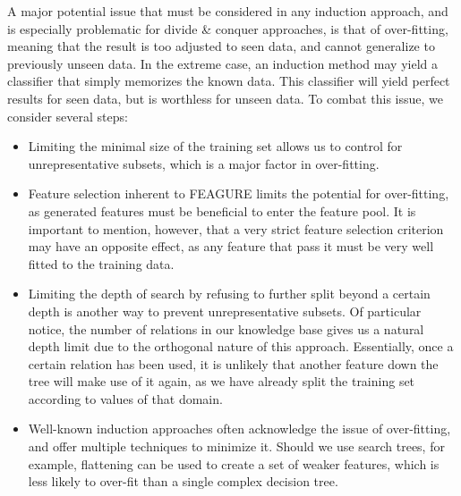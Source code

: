 \documentclass[twoside,11pt]{article}
\theoremstyle{definition}
\begin{document}
A major potential issue that must be considered in any induction approach, and is especially problematic for divide \& conquer approaches, is that of over-fitting, meaning that the result is too adjusted to seen data, and cannot generalize to previously unseen data. In the extreme case, an induction method may yield a classifier that simply memorizes the known data. This classifier will yield perfect results for seen data, but is worthless for unseen data.
To combat this issue, we consider several steps:
\begin{itemize}
	\item Limiting the minimal size of the training set allows us to control for unrepresentative subsets, which is a major factor in over-fitting.
	\item Feature selection inherent to FEAGURE limits the potential for over-fitting, as generated features must be beneficial to enter the feature pool. It is important to mention, however, that a very strict feature selection criterion may have an opposite effect, as any feature that pass it must be very well fitted to the training data.
	\item Limiting the depth of search by refusing to further split beyond a certain depth is another way to prevent unrepresentative subsets. Of particular notice, the number of relations in our knowledge base gives us a natural depth limit due to the orthogonal nature of this approach. Essentially, once a certain relation has been used, it is unlikely that another feature down the tree will make use of it again, as we have already split the training set according to values of that domain. 
	\item Well-known induction approaches often acknowledge the issue of over-fitting, and offer multiple techniques to minimize it. Should we use search trees, for example, flattening can be used to create a set of weaker features, which is less likely to over-fit than a single complex decision tree.
\end{itemize}
\end{document}
